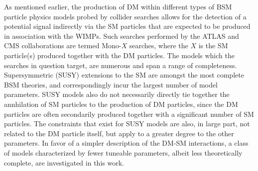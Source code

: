 As mentioned earlier, the production of DM within different types of BSM particle physics models probed by collider searches allows for the detection of a potential signal indirectly via the SM particles that are expected to be produced in association with the WIMPs. Such searches performed by the ATLAS and CMS collaborations are termed $\text{Mono}$-$X$ searches, where the $X$ is the SM particle(s) produced together with the DM particles. The models which the searches in question target, are numerous and span a range of completeness. Supersymmetric (SUSY) extensions to the SM are amongst the most complete BSM theories, and correspondingly incur the largest number of model parameters. SUSY models also do not necessarily directly tie together the annhilation of SM particles to the production of DM particles, since the DM particles are often secondarily produced together with a significant number of SM particles. The constraints that exist for SUSY models are also, in large part, not related to the DM particle itself, but apply to a greater degree to the other parameters. In favor of a simpler description of the DM-SM interactions, a class of models characterized by fewer tuneable parameters, albeit less theoretically complete, are investigated in this work. 

